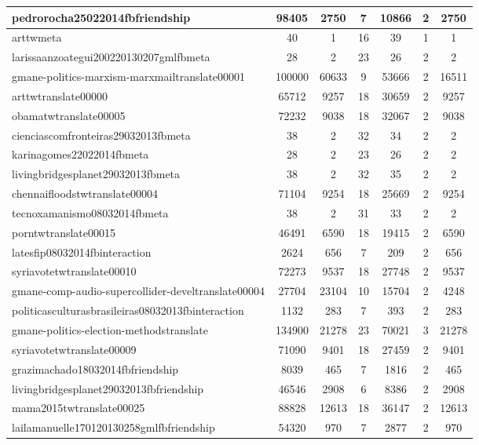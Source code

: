 \begin{table*}[h!]
\begin{center}
\begin{tabular}{| l | c | c | c | c | c | c |}
pedrorocha25022014fbfriendship & 98405  & 2750  & 7  & 10866  & 2  & 2750 \\\hline
arttwmeta & 40  & 1  & 16  & 39  & 1  & 1 \\\hline
larissaanzoategui200220130207gmlfbmeta & 28  & 2  & 23  & 26  & 2  & 2 \\\hline
gmane-politics-marxism-marxmailtranslate00001 & 100000  & 60633  & 9  & 53666  & 2  & 16511 \\\hline
arttwtranslate00000 & 65712  & 9257  & 18  & 30659  & 2  & 9257 \\\hline
obamatwtranslate00005 & 72232  & 9038  & 18  & 32067  & 2  & 9038 \\\hline
cienciascomfronteiras29032013fbmeta & 38  & 2  & 32  & 34  & 2  & 2 \\\hline
karinagomes22022014fbmeta & 28  & 2  & 23  & 26  & 2  & 2 \\\hline
livingbridgesplanet29032013fbmeta & 38  & 2  & 32  & 35  & 2  & 2 \\\hline
chennaifloodstwtranslate00004 & 71104  & 9254  & 18  & 25669  & 2  & 9254 \\\hline
tecnoxamanismo08032014fbmeta & 38  & 2  & 31  & 33  & 2  & 2 \\\hline
porntwtranslate00015 & 46491  & 6590  & 18  & 19415  & 2  & 6590 \\\hline
latesfip08032014fbinteraction & 2624  & 656  & 7  & 209  & 2  & 656 \\\hline
syriavotetwtranslate00010 & 72273  & 9537  & 18  & 27748  & 2  & 9537 \\\hline
gmane-comp-audio-supercollider-develtranslate00004 & 27704  & 23104  & 10  & 15704  & 2  & 4248 \\\hline
politicasculturasbrasileiras08032013fbinteraction & 1132  & 283  & 7  & 393  & 2  & 283 \\\hline
gmane-politics-election-methodstranslate & 134900  & 21278  & 23  & 70021  & 3  & 21278 \\\hline
syriavotetwtranslate00009 & 71090  & 9401  & 18  & 27459  & 2  & 9401 \\\hline
grazimachado18032014fbfriendship & 8039  & 465  & 7  & 1816  & 2  & 465 \\\hline
livingbridgesplanet29032013fbfriendship & 46546  & 2908  & 6  & 8386  & 2  & 2908 \\\hline
mama2015twtranslate00025 & 88828  & 12613  & 18  & 36147  & 2  & 12613 \\\hline
lailamanuelle170120130258gmlfbfriendship & 54320  & 970  & 7  & 2877  & 2  & 970 \\\hline

\end{tabular}
\end{center}
\end{table*}
